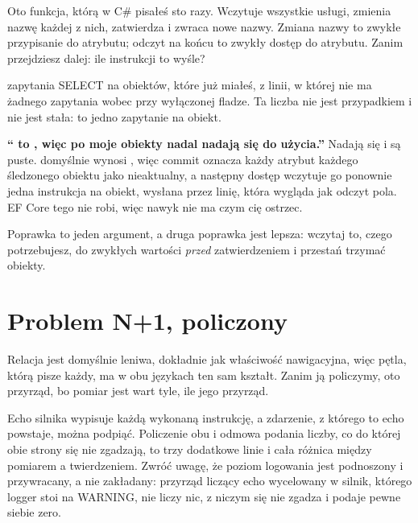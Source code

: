 Oto funkcja, którą w C\# pisałeś sto razy. Wczytuje wszystkie usługi, zmienia
nazwę każdej z nich, zatwierdza i zwraca nowe nazwy. Zmiana nazwy to zwykłe
przypisanie do atrybutu; odczyt na końcu to zwykły dostęp do atrybutu. Zanim
przejdziesz dalej: ile instrukcji to wyśle?



\noindent
{} zapytania SELECT na  obiektów,
które już miałeś, z linii, w której nie ma żadnego zapytania \dash{} wobec
 przy wyłączonej fladze. Ta liczba nie jest przypadkiem
i nie jest stała: to jedno zapytanie na obiekt.

\begin{trapbox}
\textbf{\enquote{ to , więc po
 moje obiekty nadal nadają się do użycia.}} Nadają się i są
puste.  domyślnie wynosi , więc commit
oznacza każdy atrybut każdego śledzonego obiektu jako nieaktualny, a
następny dostęp wczytuje go ponownie \dash{} jedna instrukcja na obiekt,
wysłana przez linię, która wygląda jak odczyt pola. EF Core tego nie robi,
więc nawyk nie ma czym cię ostrzec.

Poprawka to jeden argument, a druga poprawka jest lepsza: wczytaj to, czego
potrzebujesz, do zwykłych wartości \emph{przed} zatwierdzeniem i przestań
trzymać obiekty.
\end{trapbox}

\section{Problem N+1, policzony}
\label{sec:ch10-nplusone}

Relacja jest domyślnie leniwa, dokładnie jak właściwość nawigacyjna, więc
pętla, którą pisze każdy, ma w obu językach ten sam kształt. Zanim ją
policzymy, oto przyrząd, bo pomiar jest wart tyle, ile jego przyrząd.


\noindent
Echo silnika wypisuje każdą wykonaną instrukcję, a zdarzenie, z którego to
echo powstaje, można podpiąć. Policzenie obu i odmowa podania liczby, co do
której obie strony się nie zgadzają, to trzy dodatkowe linie \dash{} i cała
różnica między pomiarem a twierdzeniem. Zwróć uwagę, że poziom logowania
jest podnoszony i przywracany, a nie zakładany: przyrząd liczący echo
wycelowany w silnik, którego logger stoi na WARNING, nie liczy nic, z niczym
się nie zgadza i podaje pewne siebie zero.

